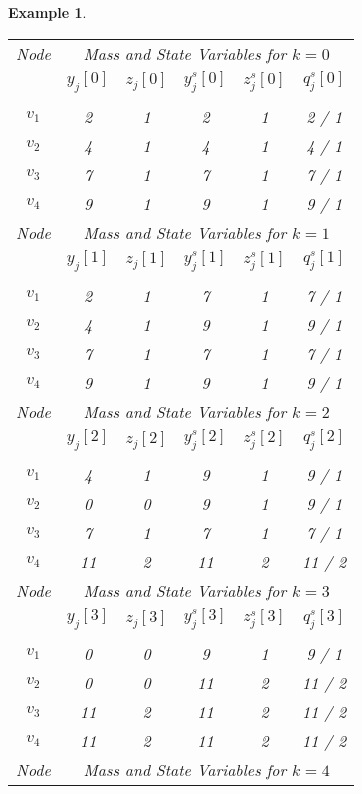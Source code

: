 \documentclass[twocolumn]{autart}    %
\newtheorem{example}{\bfseries Example}
\begin{document}
\begin{example}
\begin{table}[t]
\begin{center}
\label{table_max1}
{\small 
\begin{tabular}{|c||c|c|c|c|c|}
\hline
Node &\multicolumn{5}{c|}{Mass and State Variables for $k=0$}\\
 &$y_j[0]$&$z_j[0]$&$y^s_j[0]$&$z^s_j[0]$&$q^s_j[0]$\\
\cline{1-6}
 &  &  &  &  & \\
$v_1$ & 2 & 1 & 2 & 1 & 2 / 1\\
$v_2$ & 4 & 1 & 4 & 1 & 4 / 1\\
$v_3$ & 7 & 1 & 7 & 1 & 7 / 1\\
$v_4$ & 9 & 1 & 9 & 1 & 9 / 1\\
\hline
Node &\multicolumn{5}{c|}{Mass and State Variables for $k=1$}\\
 &$y_j[1]$&$z_j[1]$&$y^s_j[1]$&$z^s_j[1]$&$q^s_j[1]$\\
\cline{1-6}
 &  &  &  &  & \\
$v_1$ & 2 & 1 & 7 & 1 & 7 / 1\\
$v_2$ & 4 & 1 & 9 & 1 & 9 / 1\\
$v_3$ & 7 & 1 & 7 & 1 & 7 / 1\\
$v_4$ & 9 & 1 & 9 & 1 & 9 / 1\\
\hline
Node &\multicolumn{5}{c|}{Mass and State Variables for $k=2$}\\
 &$y_j[2]$&$z_j[2]$&$y^s_j[2]$&$z^s_j[2]$&$q^s_j[2]$\\
\cline{1-6}
 &  &  &  &  & \\
$v_1$ & 4 & 1 & 9 & 1 & 9 / 1\\
$v_2$ & 0 & 0 & 9 & 1 & 9 / 1\\
$v_3$ & 7 & 1 & 7 & 1 & 7 / 1\\
$v_4$ & 11 & 2 & 11 & 2 & 11 / 2\\
\hline
Node &\multicolumn{5}{c|}{Mass and State Variables for $k=3$}\\
 &$y_j[3]$&$z_j[3]$&$y^s_j[3]$&$z^s_j[3]$&$q^s_j[3]$\\
\cline{1-6}
 &  &  &  &  & \\
$v_1$ & 0 & 0 & 9 & 1 & 9 / 1\\
$v_2$ & 0 & 0 & 11 & 2 & 11 / 2\\
$v_3$ & 11 & 2 & 11 & 2 & 11 / 2\\
$v_4$ & 11 & 2 & 11 & 2 & 11 / 2\\
\hline
Node &\multicolumn{5}{c|}{Mass and State Variables for $k=4$}\\

\end{tabular}}
\end{center}
\end{table}
\end{example}
\end{document}
